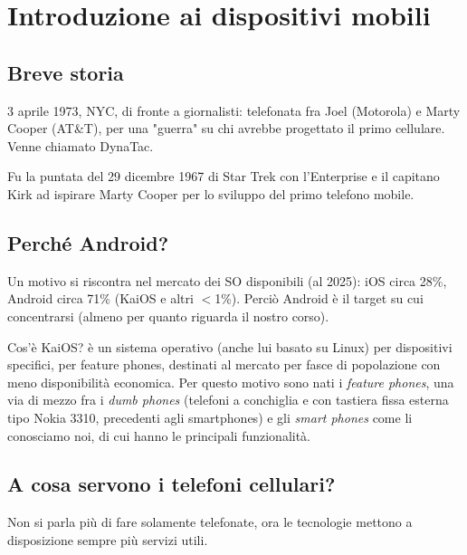 
\chapter{Introduzione ai dispositivi mobili}
\section{Breve storia}
\par 3 aprile 1973, NYC, di fronte a giornalisti: telefonata fra Joel (Motorola) e Marty Cooper (AT\&T), per una "guerra" su chi avrebbe progettato il primo cellulare. Venne chiamato DynaTac.
\par Fu la puntata del 29 dicembre 1967 di Star Trek con l'Enterprise e il capitano Kirk ad ispirare Marty Cooper per lo sviluppo del primo telefono mobile.

\section{Perché Android?}
\par Un motivo si riscontra nel mercato dei SO disponibili (al 2025): iOS circa 28\%, Android circa 71\% (KaiOS e altri $<$1\%). Perciò Android è il target su cui concentrarsi (almeno per quanto riguarda il nostro corso).
\par Cos'è KaiOS? è un sistema operativo (anche lui basato su Linux) per dispositivi specifici, per feature phones, destinati al mercato per fasce di popolazione con meno disponibilità economica. Per questo motivo sono nati i \textit{feature phones}, una via di mezzo fra i \textit{dumb phones} (telefoni a conchiglia e con tastiera fissa esterna tipo Nokia 3310, precedenti agli smartphones) e gli \textit{smart phones} come li conosciamo noi, di cui hanno le principali funzionalità.

\section{A cosa servono i telefoni cellulari?}
\par Non si parla più di fare solamente telefonate, ora le tecnologie mettono a disposizione sempre più servizi utili. 

